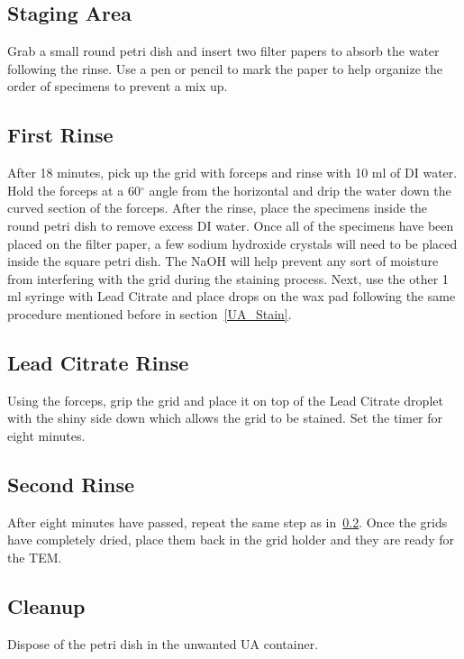 \subsection{Staging Area}
Grab a small round petri dish and insert two filter papers to absorb the water following the rinse.  Use a pen or pencil to mark the paper to help organize the order of specimens to prevent a mix up.  

\subsection{First Rinse}\label{first_rinse}
After 18 minutes, pick up the grid with forceps and rinse with 10 ml of DI water.  Hold the forceps at a 60$^\circ$ angle from the horizontal and drip the water down the curved section of the forceps.  After the rinse, place the specimens inside the round petri dish to remove excess DI water.  Once all of the specimens have been placed on the filter paper, a few sodium hydroxide crystals will need to be placed inside the square petri dish.  The NaOH will help prevent any sort of moisture from interfering with the grid during the staining process.  Next, use the other 1 ml syringe with Lead Citrate and place drops on the wax pad following the same procedure mentioned before in section~\ref{UA_Stain}.

\subsection{Lead Citrate Rinse}
Using the forceps, grip the grid and place it on top of the Lead Citrate droplet with the shiny side down which allows the grid to be stained.  Set the timer for eight minutes.

\subsection{Second Rinse}
After eight minutes have passed, repeat the same step as in~\ref{first_rinse}.  Once the grids have completely dried, place them back in the grid holder and they are ready for the TEM.

\subsection{Cleanup}
Dispose of the petri dish in the unwanted UA container.